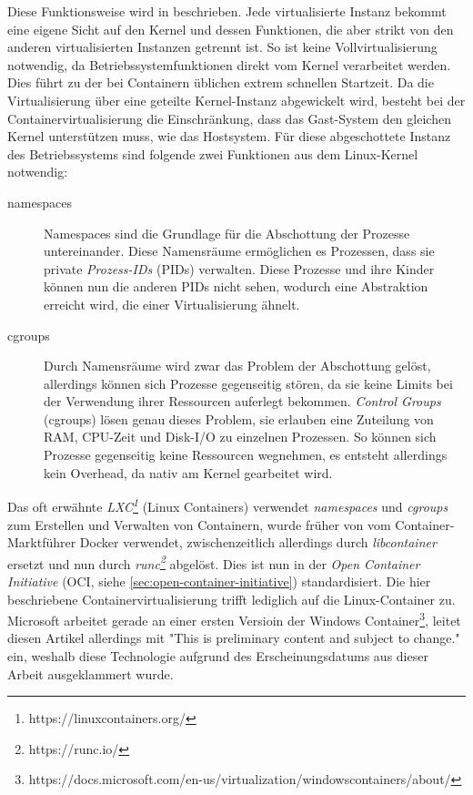 Diese Funktionsweise wird in \autocite{Diedrich2016} beschrieben.
Jede virtualisierte Instanz bekommt eine eigene Sicht auf den Kernel und dessen Funktionen, die aber strikt von den anderen virtualisierten Instanzen getrennt ist.
So ist keine Vollvirtualisierung notwendig, da Betriebssystemfunktionen direkt vom Kernel verarbeitet werden.
Dies führt zu der bei Containern üblichen extrem schnellen Startzeit.
Da die Virtualisierung über eine geteilte Kernel-Instanz abgewickelt wird, besteht bei der Containervirtualisierung die Einschränkung, dass das Gast-System den gleichen Kernel unterstützen muss, wie das Hostsystem.
Für diese abgeschottete Instanz des Betriebssystems sind folgende zwei Funktionen aus dem Linux-Kernel notwendig:
\begin{description}
    \item [namespaces] Namespaces sind die Grundlage für die Abschottung der Prozesse untereinander. Diese Namensräume ermöglichen es Prozessen, dass sie private \emph{Prozess-IDs} (PIDs) verwalten. Diese Prozesse und ihre Kinder können nun die anderen PIDs nicht sehen, wodurch eine Abstraktion erreicht wird, die einer Virtualisierung ähnelt.
    \item [cgroups] Durch Namensräume wird zwar das Problem der Abschottung gelöst, allerdings können sich Prozesse gegenseitig stören, da sie keine Limits bei der Verwendung ihrer Ressourcen auferlegt bekommen. \emph{Control Groups} (cgroups) lösen genau dieses Problem, sie erlauben eine Zuteilung von RAM, CPU-Zeit und Disk-I/O zu einzelnen Prozessen. So können sich Prozesse gegenseitig keine Ressourcen wegnehmen, es entsteht allerdings kein Overhead, da nativ am Kernel gearbeitet wird.
\end{description}
Das oft erwähnte \emph{LXC\footnote{https://linuxcontainers.org/}} (Linux Containers) verwendet \emph{namespaces} und \emph{cgroups} zum Erstellen und Verwalten von Containern, wurde früher von vom Container-Marktführer Docker verwendet, zwischenzeitlich allerdings durch \emph{libcontainer} ersetzt und nun durch \emph{runc\footnote{https://runc.io/}} abgelöst.
Dies ist nun in der \emph{Open Container Initiative} (OCI, siehe \cref{sec:open-container-initiative}) standardisiert.
Die hier beschriebene Containervirtualisierung trifft lediglich auf die Linux-Container zu. Microsoft arbeitet gerade an einer ersten Versioin der Windows Container\footnote{https://docs.microsoft.com/en-us/virtualization/windowscontainers/about/}, leitet diesen Artikel allerdings mit "This is preliminary content and subject to change." ein, weshalb diese Technologie aufgrund des Erscheinungsdatums aus dieser Arbeit ausgeklammert wurde.

